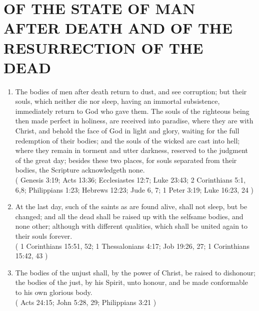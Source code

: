 \documentclass[12pt,a4paper]{book}
\begin{document}
\chapter{OF THE STATE OF MAN AFTER DEATH AND OF THE RESURRECTION OF THE DEAD}
\label{ch-stat-dea}
\begin{enumerate}
\item
\label{ch-stat-dea-1}
The bodies of men after death return to dust, and see corruption; but their souls, which neither die nor sleep, having an immortal subsistence, immediately return to God who gave them. The souls of the righteous being then made perfect in holiness, are received into paradise, where they are with Christ, and behold the face of God in light and glory, waiting for the full redemption of their bodies; and the souls of the wicked are cast into hell; where they remain in torment and utter darkness, reserved to the judgment of the great day; besides these two places, for souls separated from their bodies, the Scripture acknowledgeth none.\\
( Genesis 3:19; Acts 13:36; Ecclesiastes 12:7; Luke 23:43; 2 Corinthians 5:1, 6,8; Philippians 1:23; Hebrews 12:23; Jude 6, 7; 1 Peter 3:19; Luke 16:23, 24 )
\item
\label{ch-stat-dea-2}
At the last day, such of the saints as are found alive, shall not sleep, but be changed; and all the dead shall be raised up with the selfsame bodies, and none other; although with different qualities, which shall be united again to their souls forever.\\
( 1 Corinthians 15:51, 52; 1 Thessalonians 4:17; Job 19:26, 27; 1 Corinthians 15:42, 43 )
\item
\label{ch-stat-dea-3}
The bodies of the unjust shall, by the power of Christ, be raised to dishonour; the bodies of the just, by his Spirit, unto honour, and be made conformable to his own glorious body.\\
( Acts 24:15; John 5:28, 29; Philippians 3:21 )
\end{enumerate}
\end{document}
